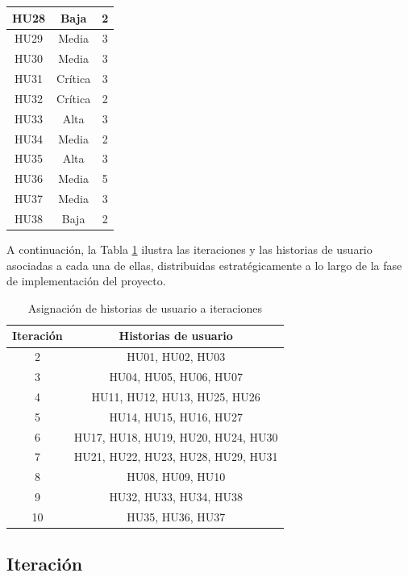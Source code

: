 \begin{longtable}{|c|c|c|}
  HU28 & Baja & 2 \\ \hline
  HU29 & Media & 3 \\ \hline
  HU30 & Media & 3 \\ \hline
  HU31 & Crítica & 3 \\ \hline
  HU32 & Crítica & 2 \\ \hline
  HU33 & Alta & 3 \\ \hline
  HU34 & Media & 2 \\ \hline
  HU35 & Alta & 3 \\ \hline
  HU36 & Media & 5 \\ \hline
  HU37 & Media & 3 \\ \hline
  HU38 & Baja & 2 \\
\end{longtable}

A continuación, la Tabla \ref{tab:iteraciones} ilustra las iteraciones y las historias de usuario asociadas a cada una de ellas, distribuidas estratégicamente a lo largo de la fase de implementación del proyecto.
\begin{table}[h]
  \centering
  \caption{Asignación de historias de usuario a iteraciones}
  \label{tab:iteraciones}
  \renewcommand{\arraystretch}{1.2}
  \begin{tabular}{|c|c|}
    \hline
    \textbf{Iteración} & \textbf{Historias de usuario} \\
    \hline
    2 & HU01, HU02, HU03 \\ \hline
    3 & HU04, HU05, HU06, HU07 \\ \hline
    4 & HU11, HU12, HU13, HU25, HU26 \\ \hline
    5 & HU14, HU15, HU16, HU27 \\ \hline
    6 & HU17, HU18, HU19, HU20, HU24, HU30 \\ \hline
    7 & HU21, HU22, HU23, HU28, HU29, HU31 \\ \hline
    8 & HU08, HU09, HU10 \\ \hline
    9 & HU32, HU33, HU34, HU38 \\ \hline
    10 & HU35, HU36, HU37 \\ \hline
  \end{tabular}
\end{table}

\subsection{Iteración}

